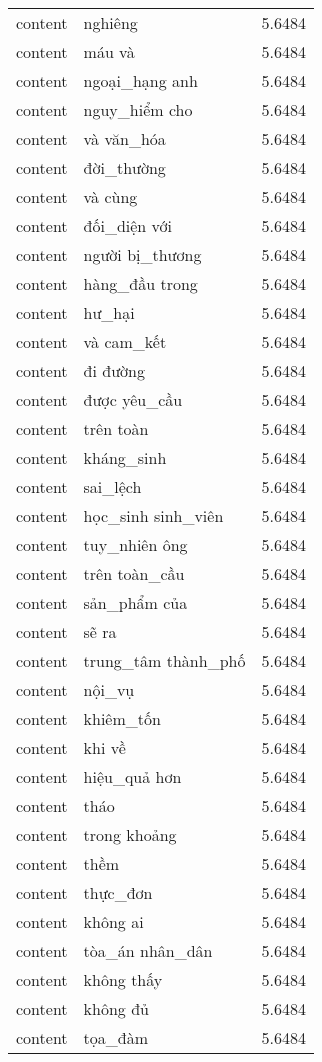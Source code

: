 \documentclass{article}
\begin{document}
\begin{tabular}{lll}
content & nghiêng & 5.6484\\
content & máu và & 5.6484\\
content & ngoại\_hạng anh & 5.6484\\
content & nguy\_hiểm cho & 5.6484\\
content & và văn\_hóa & 5.6484\\
content & đời\_thường & 5.6484\\
content & và cùng & 5.6484\\
content & đối\_diện với & 5.6484\\
content & người bị\_thương & 5.6484\\
content & hàng\_đầu trong & 5.6484\\
content & hư\_hại & 5.6484\\
content & và cam\_kết & 5.6484\\
content & đi đường & 5.6484\\
content & được yêu\_cầu & 5.6484\\
content & trên toàn & 5.6484\\
content & kháng\_sinh & 5.6484\\
content & sai\_lệch & 5.6484\\
content & học\_sinh sinh\_viên & 5.6484\\
content & tuy\_nhiên ông & 5.6484\\
content & trên toàn\_cầu & 5.6484\\
content & sản\_phẩm của & 5.6484\\
content & sẽ ra & 5.6484\\
content & trung\_tâm thành\_phố & 5.6484\\
content & nội\_vụ & 5.6484\\
content & khiêm\_tốn & 5.6484\\
content & khi về & 5.6484\\
content & hiệu\_quả hơn & 5.6484\\
content & tháo & 5.6484\\
content & trong khoảng & 5.6484\\
content & thềm & 5.6484\\
content & thực\_đơn & 5.6484\\
content & không ai & 5.6484\\
content & tòa\_án nhân\_dân & 5.6484\\
content & không thấy & 5.6484\\
content & không đủ & 5.6484\\
content & tọa\_đàm & 5.6484\\

\end{tabular}
\end{document}
